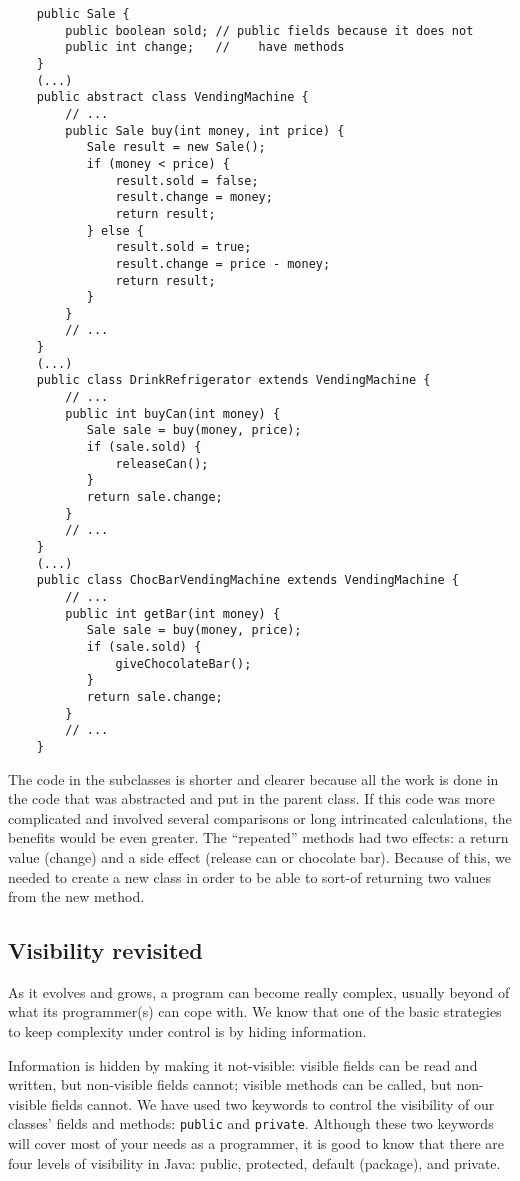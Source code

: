 \begin{verbatim}
    public Sale {
        public boolean sold; // public fields because it does not
        public int change;   //    have methods
    }
    (...)
    public abstract class VendingMachine {
        // ...
        public Sale buy(int money, int price) {
           Sale result = new Sale();
           if (money < price) {
               result.sold = false;
               result.change = money;
               return result;
           } else {
               result.sold = true;
               result.change = price - money;
               return result;
           }
        }
        // ...
    }
    (...)
    public class DrinkRefrigerator extends VendingMachine {
        // ...
        public int buyCan(int money) {
           Sale sale = buy(money, price);
           if (sale.sold) {
               releaseCan();
           } 
           return sale.change;
        }
        // ...
    }
    (...)
    public class ChocBarVendingMachine extends VendingMachine {
        // ...
        public int getBar(int money) {
           Sale sale = buy(money, price);
           if (sale.sold) {
               giveChocolateBar();
           }
           return sale.change;
        }
        // ...
    }
\end{verbatim}

The code in the subclasses is shorter and clearer because all the work
is done in the code that was abstracted and put in the parent
class. If this code was more complicated and involved several
comparisons or long intrincated calculations, the benefits would be
even greater. The ``repeated'' methods had two effects: a return value
(change) and a side effect (release can or chocolate bar). Because of
this, we needed to create a new class in order to be able to sort-of
returning two values from the new method. 

\subsection{Visibility revisited}
\label{sec:protected-keyword}

As it evolves and grows, a program can become really complex, usually
beyond of what its programmer(s) can cope with. We know that one of
the basic strategies to keep complexity under control is by hiding
information. 

Information is hidden by making it not-visible: visible fields can be
read and written, but non-visible fields cannot; visible methods can
be called, but non-visible fields cannot.  We have used two keywords
to control the visibility of our classes' fields and methods:
\verb+public+ and \verb+private+. Although these two keywords will
cover most of your needs as a programmer, it is good to know that
there are four levels of visibility in Java: public, protected,
default (package), and private.

